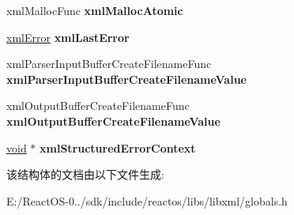 \begin{DoxyCompactItemize}
xml\+Malloc\+Func {\bfseries xml\+Malloc\+Atomic}
\item 
\mbox{\label{struct__xml_global_state_afd5f9c9dc58ab8f75fb0074370e18bbb}} 
\hyperlink{struct__xml_error}{xml\+Error} {\bfseries xml\+Last\+Error}
\item 
\mbox{\label{struct__xml_global_state_a4426a58b33b2f1db58f66c4a01d1044c}} 
xml\+Parser\+Input\+Buffer\+Create\+Filename\+Func {\bfseries xml\+Parser\+Input\+Buffer\+Create\+Filename\+Value}
\item 
\mbox{\label{struct__xml_global_state_ad9c2ba58bc1b222cd1189a265a137276}} 
xml\+Output\+Buffer\+Create\+Filename\+Func {\bfseries xml\+Output\+Buffer\+Create\+Filename\+Value}
\item 
\mbox{\label{struct__xml_global_state_a2946a64156d7b48ddb2002f1cabf36c6}} 
\hyperlink{interfacevoid}{void} $\ast$ {\bfseries xml\+Structured\+Error\+Context}
\end{DoxyCompactItemize}


该结构体的文档由以下文件生成\+:\begin{DoxyCompactItemize}
\item 
E\+:/\+React\+O\+S-\/0../sdk/include/reactos/libs/libxml/globals.\+h\end{DoxyCompactItemize}
